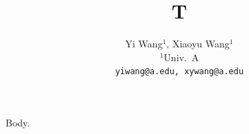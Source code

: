 \documentclass{article}
\title{T}
\author{Yi Wang$^{1}$, Xiaoyu Wang$^{1}$\\ $^{1}$Univ.\ A\\
  \texttt{yiwang@a.edu, xywang@a.edu}}
\begin{document}
\maketitle
Body.
\end{document}
